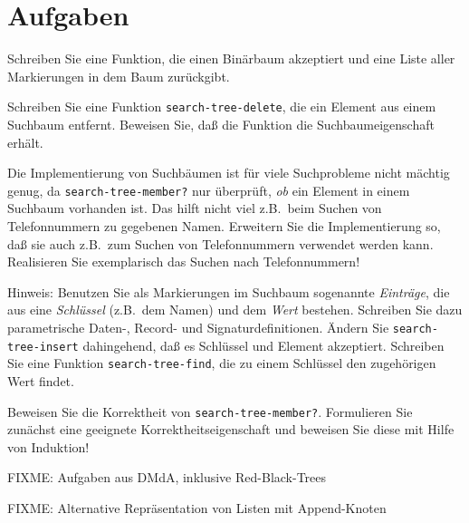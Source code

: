 \section*{Aufgaben}

\begin{aufgabe}
  Schreiben Sie eine Funktion, die einen Binärbaum akzeptiert
  und eine Liste aller Markierungen in dem Baum zurückgibt.
\end{aufgabe}

\begin{aufgabe}
  Schreiben Sie eine Funktion \texttt{search-tree-delete}, die ein
  Element aus einem Suchbaum entfernt.  Beweisen Sie, daß die Funktion die
  Suchbaumeigenschaft erhält.
\end{aufgabe}

\begin{aufgabe}
  Die Implementierung von Suchbäumen ist für viele Suchprobleme nicht
  mächtig genug, da \texttt{search-tree-member?} nur überprüft,
  \emph{ob} ein Element in einem Suchbaum vorhanden ist.  Das hilft
  nicht viel z.B.\ beim Suchen von Telefonnummern zu gegebenen Namen.
  Erweitern Sie die Implementierung so, daß sie auch z.B.\ zum Suchen
  von Telefonnummern verwendet werden kann.  Realisieren Sie
  exemplarisch das Suchen nach Telefonnummern!

  Hinweis: Benutzen Sie als Markierungen im Suchbaum sogenannte
  \textit{Einträge}, die aus eine \textit{Schlüssel} (z.B.\ dem Namen)
  und dem \textit{Wert} bestehen.  Schreiben Sie dazu parametrische Daten-,
  Record- und Signaturdefinitionen. Ändern Sie \texttt{search-tree-insert}
  dahingehend, daß es Schlüssel und Element akzeptiert.  Schreiben Sie eine
  Funktion \texttt{search-tree-find}, die zu einem Schlüssel den
  zugehörigen Wert findet.
\end{aufgabe}

\begin{aufgabe}
  Beweisen Sie die Korrektheit von \texttt{search-tree-member?}.
  Formulieren Sie zunächst eine geeignete Korrektheitseigenschaft und
  beweisen Sie diese mit Hilfe von Induktion!
\end{aufgabe}

\begin{aufgabe}
  FIXME: Aufgaben aus DMdA, inklusive Red-Black-Trees
\end{aufgabe}

\begin{aufgabe}
  FIXME: Alternative Repräsentation von Listen mit Append-Knoten
\end{aufgabe}

